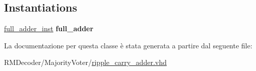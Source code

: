 \subsection*{Instantiations}
 \begin{DoxyCompactItemize}
\item 
\hypertarget{classripple__carry__adder_1_1structural_a60ec93732c44bf4202181710b7c573bd}{\hyperlink{classripple__carry__adder_1_1structural_a60ec93732c44bf4202181710b7c573bd}{full\+\_\+adder\+\_\+inst}  {\bfseries full\+\_\+adder}   }\label{classripple__carry__adder_1_1structural_a60ec93732c44bf4202181710b7c573bd}

\end{DoxyCompactItemize}


La documentazione per questa classe è stata generata a partire dal seguente file\+:\begin{DoxyCompactItemize}
\item 
R\+M\+Decoder/\+Majority\+Voter/\hyperlink{ripple__carry__adder_8vhd}{ripple\+\_\+carry\+\_\+adder.\+vhd}\end{DoxyCompactItemize}
